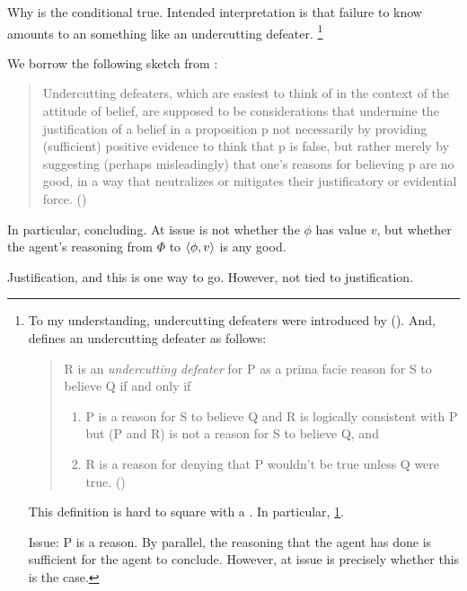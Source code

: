 \begin{note}
  Why is the conditional true.
  Intended interpretation is that failure to know \fc{} amounts to an something like an undercutting defeater.%
  \footnote{
    To my understanding, undercutting defeaters were introduced by \citeauthor{Pollock:1987un} (\citeyear{Pollock:1987un}).
    And, \citeauthor{Pollock:1987un} defines an undercutting defeater as follows:
    \begin{quote}
    R is an \emph{undercutting defeater} for P as a prima facie reason for S to believe Q if and only if
    \begin{enumerate}[label=(UD\arabic*), ref=(UD\arabic*)]
    \item
      \label{pollock:ud:1}
      P is a reason for S to believe Q and R is logically consistent with P but (P and R) is not a reason for S to believe Q, and
    \item
      \label{pollock:ud:2}
      R is a reason for denying that P wouldn't be true unless Q were true.%
      \mbox{}\hfill\mbox{(\citeyear[485]{Pollock:1987un})}
    \end{enumerate}
  \end{quote}
  This definition is hard to square with a \requ{}.
  In particular, \ref{pollock:ud:1}.

  Issue: P is a reason.
  By parallel, the reasoning that the agent has done is sufficient for the agent to conclude.
  However, at issue is precisely whether this is the case.

  }

  We borrow the following sketch from \textcite{Worsnip:2018aa}:
  \begin{quote}
    Undercutting defeaters, which are easiest to think of in the context of the attitude of belief, are supposed to be considerations that undermine the justification of a belief in a proposition p not necessarily by providing (sufficient) positive evidence to think that p is false, but rather merely by suggesting (perhaps misleadingly) that one’s reasons for believing p are no good, in a way that neutralizes or mitigates their justificatory or evidential force.%
    \mbox{}\hfill\mbox{(\citeyear[29]{Worsnip:2018aa})}
  \end{quote}

  In particular, concluding.
  At issue is not whether the \(\phi\) has value \(v\), but whether the agent's reasoning from \(\Phi\) to \(\langle \phi, v \rangle\) is any good.

  Justification, and this is one way to go.
  However, not tied to justification.
\end{note}


